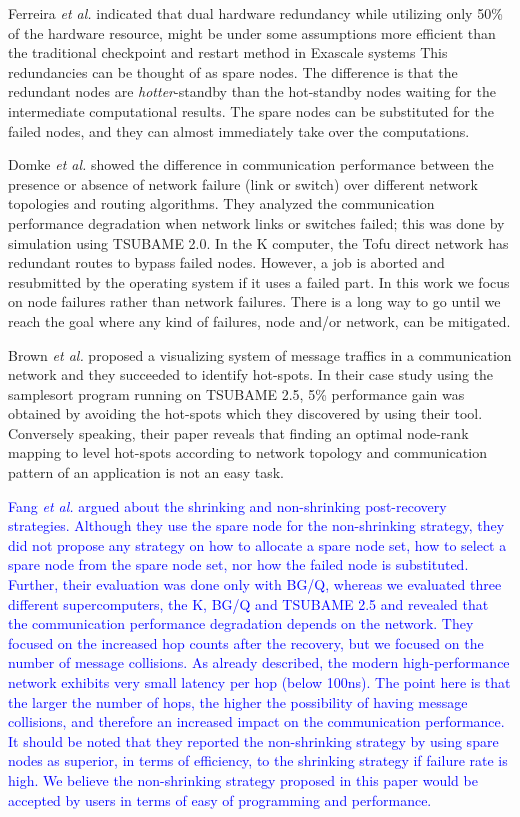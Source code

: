 \documentclass[Afour,times,sagev]{sagej}
\newcommand{\AH}[1]{%
  \textcolor{blue}{#1}}%
\begin{document}
Ferreira {\it et al.} indicated that dual hardware redundancy while
utilizing only 50\% of the hardware resource, might be under some
assumptions more efficient than the traditional checkpoint and restart
method in Exascale systems This redundancies can be thought of as
spare nodes. The difference is that the redundant nodes are {\it
  hotter}-standby than the hot-standby nodes waiting for the
intermediate computational results. The spare nodes can be substituted
for the failed nodes, and they can almost immediately take over the
computations.

Domke {\it et al.} showed the difference in communication performance
between the presence or absence of network failure (link or switch)
over different network topologies and routing
algorithms\citep{Domke:2014:FND:2683593.2683659}. They analyzed the
communication performance degradation when network links or switches
failed; this was done by simulation using TSUBAME 2.0. In the K
computer, the Tofu direct network has redundant routes to bypass
failed nodes. However, a job is aborted and resubmitted by the
operating system if it uses a failed part. In this work we focus on
node failures rather than network failures. There is a
long way to go until we reach the goal where any kind of failures,
node and/or network, can be mitigated.

Brown {\it et al.} proposed a visualizing system of message traffics
in a communication network\cite{7384355} and they succeeded to
identify hot-spots. In their case study using the samplesort program
running on TSUBAME 2.5, 5\% performance gain was obtained by avoiding
the hot-spots which they discovered by using their tool. Conversely
speaking, their paper reveals that finding an optimal node-rank
mapping to level hot-spots according to network topology and
communication pattern of an application is not an easy task.

\AH{Fang {\it et al.} argued about the shrinking and
non-shrinking post-recovery strategies. Although they use the spare
node for the non-shrinking strategy, they did not propose any
strategy on how to allocate a spare node set, how to select a spare node from
the spare node set, nor how the failed node is substituted. Further,
their evaluation was done only with BG/Q, whereas we evaluated three
different supercomputers, the K, BG/Q and TSUBAME 2.5 and revealed
that the communication performance degradation depends on
the network. They focused on the increased hop counts after the
recovery,  but we focused on the number of message collisions. As
already described, the modern high-performance network
exhibits very small latency per hop (below 100ns). The point here is
that the larger the number of hops, the higher the possibility of
having message collisions, and therefore an increased impact on
the communication performance. It should be noted that they reported
the non-shrinking strategy by using spare nodes as superior, in terms
of efficiency, to the shrinking strategy if failure rate is high. We
believe the non-shrinking strategy proposed in this paper would be
accepted by users in terms of easy of programming and performance.
}
\end{document}
